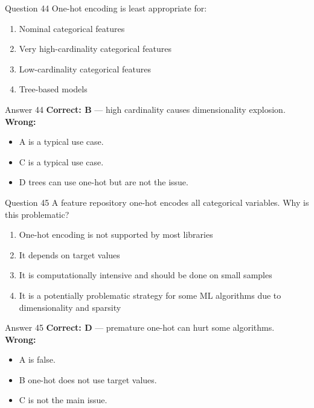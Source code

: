 \documentclass[aspectratio=169,11pt]{beamer}
\begin{document}
	\begin{frame}{Question 44}
		One-hot encoding is least appropriate for:
		\begin{enumerate}[label=\Alph*.]
			\item Nominal categorical features
			\item Very high-cardinality categorical features
			\item Low-cardinality categorical features
			\item Tree-based models
		\end{enumerate}
	\end{frame}
	\begin{frame}{Answer 44}
		\textbf{Correct: B} --- high cardinality causes dimensionality explosion.\\
		\vspace{0.5em}
		\textbf{Wrong:}
		\begin{itemize}
			\item A is a typical use case.
			\item C is a typical use case.
			\item D trees can use one-hot but are not the issue.
		\end{itemize}
	\end{frame}
	
	\begin{frame}{Question 45}
		A feature repository one-hot encodes all categorical variables. Why is this problematic?
		\begin{enumerate}[label=\Alph*.]
			\item One-hot encoding is not supported by most libraries
			\item It depends on target values
			\item It is computationally intensive and should be done on small samples
			\item It is a potentially problematic strategy for some ML algorithms due to dimensionality and sparsity
		\end{enumerate}
	\end{frame}
	\begin{frame}{Answer 45}
		\textbf{Correct: D} --- premature one-hot can hurt some algorithms.\\
		\vspace{0.5em}
		\textbf{Wrong:}
		\begin{itemize}
			\item A is false.
			\item B one-hot does not use target values.
			\item C is not the main issue.
		\end{itemize}
	\end{frame}
	
\end{document}
